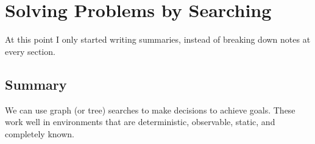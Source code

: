 \chapter{Solving Problems by Searching} %
\label{cha:solving_problems_by_searching}

{
\rmk At this point I only started writing summaries, instead of breaking down
notes at every section.
}
\section{Summary} %
\label{sec:summary}

We can use graph (or tree) searches to make decisions to achieve goals.
These work well in environments that are deterministic, observable, static, and
completely known.

